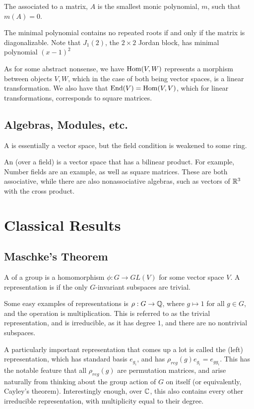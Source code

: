 \documentclass{article}
\begin{document}
\begin{definition}
The  associated to a matrix, $A$ is the smallest monic polynomial, $m$, such that $m(A)=0$.
\end{definition}
The minimal polynomial contains no repeated roots if and only if the matrix is diagonalizable. Note that $J_1(2)$, the $2 \times 2$ Jordan block, has minimal polynomial $(x-1)^2$

As for some abstract nonsense, we have $\operatorname{Hom}(V,W)$ represents a morphism between objects $V,W$, which in the case of both being vector spaces, is a linear transformation. We also have that $\operatorname{End}(V) = \operatorname{Hom}(V,V)$, which for linear transformations, corresponds to square matrices.

\subsection{Algebras, Modules, etc.}
A  is essentially a vector space, but the field condition is weakened to some ring.

An  (over a field) is a vector space that has a bilinear product. For example, Number fields are an example, as well as square matrices. These are both associative, while there are also nonassociative algebras, such as vectors of $\mathbb R^3$ with the cross product.

\section{Classical Results}
\subsection{Maschke's Theorem}
\begin{definition}
A  of a group is a homomorphism $\phi : G \to GL(V)$ for some vector space $V$. A representation is  if the only $G$-invariant subspaces are trivial.
\end{definition}

Some easy examples of representations is $\rho : G \to \mathbb Q$, where $g \mapsto 1$ for all $g \in G$, and the operation is multiplication. This is referred to as the trivial representation, and is irreducible, as it has degree $1$, and there are no nontrivial subspaces.

A particularly important representation that comes up a lot is called the (left)  representation, which has standard basis $e_{g_i}$, and has $\rho_{reg}(g) e_{g_i} = e_{gg_i}$. This has the notable feature that all  $\rho_{reg} (g)$ are permutation matrices, and arise naturally from thinking about the group action of $G$ on itself (or equivalently, Cayley's theorem). Interestingly enough, over $\mathbb C$, this also contains every other irreducible representation, with multiplicity equal to their degree.
\end{document}
